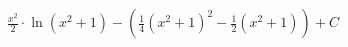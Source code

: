 \documentclass[preview]{standalone}
\begin{document}
\begin{align*}
\frac{x^2}{2} \cdot \ln(x^2 + 1) - \left( \frac{1}{4} (x^2 + 1)^2 - \frac{1}{2} (x^2 + 1) \right) + C
\end{align*}
\end{document}
